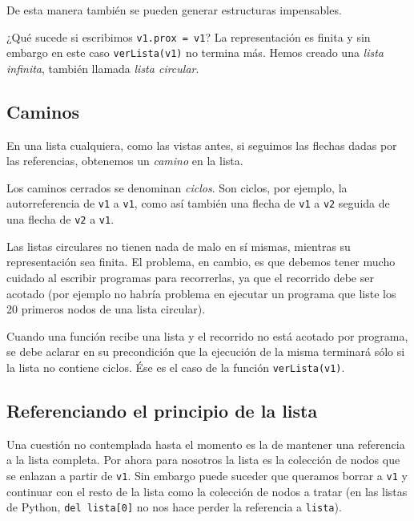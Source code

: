 De esta manera también se pueden generar estructuras impensables.

¿Qué sucede si escribimos \lstinline!v1.prox = v1!? La representación es finita
y sin embargo en este caso \lstinline!verLista(v1)!  no termina más. Hemos
creado una {\it lista infinita}, también llamada {\it lista circular}.


\subsection{Caminos}

En una lista cualquiera, como las vistas antes, si seguimos las flechas
dadas por las referencias, obtenemos un {\it camino} en la lista.

Los caminos cerrados se denominan {\it ciclos}. Son ciclos, por ejemplo, la
autorreferencia de \lstinline|v1| a \lstinline|v1|, como así también una
flecha de \lstinline|v1| a \lstinline|v2| seguida de una flecha de
\lstinline|v2| a \lstinline|v1|.

\begin{atencion}
Las listas circulares no tienen nada de malo en sí mismas,
mientras su representación sea finita. El problema, en cambio, es que debemos tener
mucho cuidado al escribir programas para recorrerlas, ya que el recorrido
debe ser acotado (por ejemplo no habría problema en ejecutar un programa
que liste los 20 primeros nodos de una lista circular).

Cuando una función recibe una lista y el recorrido no está acotado
por programa, se debe aclarar en su precondición que la ejecución de la misma terminará
sólo si la lista no contiene ciclos. Ése es el caso de la función
\lstinline|verLista(v1)|.
\end{atencion}

\subsection{Referenciando el principio de la lista}

Una cuestión no contemplada hasta el momento es la de mantener una referencia
a la lista completa. Por ahora para nosotros la lista es la colección de nodos
que se enlazan a partir de \lstinline|v1|. Sin embargo puede suceder que queramos
borrar a \lstinline|v1| y continuar con el resto de la lista como la colección de
nodos a tratar (en las listas de Python, \lstinline|del lista[0]| no nos hace perder
la referencia a \lstinline|lista|).

